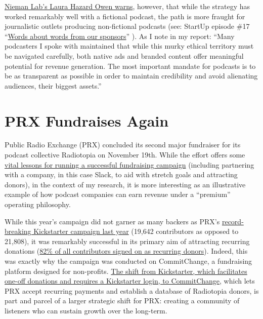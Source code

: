 \documentclass[notoc, symmetric, nobib, nols]{towcenter-guideto-book}
\begin{document}
\href{http://www.niemanlab.org/2015/11/how-did-the-ge-branded-podcast-the-message-hit-no-1-on-itunes-in-part-by-sounding-nothing-like-an-ad/}{Nieman Lab's Laura Hazard Owen warns}, however, that while the strategy has worked remarkably well with a fictional podcast, the path is more fraught for journalistic outlets producing non-fictional podcasts\autocite{niemanMessage} (see: StartUp episode \#17 ``\href{https://gimletmedia.com/episode/17-words-about-words-from-our-sponsors/}{Words about words from our sponsors}'' \autocite{gimletPodcast}). As I note in my report: ``Many podcasters I spoke with maintained that while this murky ethical territory must be navigated carefully, both native ads and branded content offer meaningful potential for revenue generation. The most important mandate for podcasts is to be as transparent as possible in order to maintain credibility and avoid alienating audiences, their biggest assets.'' 

\section{PRX Fundraises Again}
Public Radio Exchange (PRX) concluded its second major fundraiser for its podcast collective Radiotopia on November 19th. While the effort offers some \href{http://blog.prx.org/2015/11/the-coin-the-quilt-and-the-superfan-radiotopia-fundraising-lessons/}{vital lessons for running a successful fundraising campaign} (including partnering with a company, in this case Slack, to aid with stretch goals and attracting donors), in the context of my research, it is more interesting as an illustrative example of how podcast companies can earn revenue under a ``premium'' operating philosophy.\autocite{PRXblog} 

While this year's campaign did not garner as many backers as PRX's \href{http://knightfoundation.org/blogs/knightblog/2014/11/14/radiotopia-sets-record-for-publishing-and-radio-funding-on-kickstarter/}{record-breaking Kickstarter campaign last year} (19,642 contributors as opposed to 21,808)\autocite{radiotopia}, it was remarkably successful in its primary aim of attracting recurring donations (\href{http://blog.prx.org/2015/11/the-coin-the-quilt-and-the-superfan-radiotopia-fundraising-lessons/}{82\% of all contributors signed on as recurring donors}\autocite{PRXblog}). Indeed, this was exactly why the campaign was conducted on CommitChange, a fundraising platform designed for non-profits. \href{http://www.niemanlab.org/2015/10/how-prx-and-radiotopia-are-rethinking-the-public-radio-pledge-drive-for-the-podcast-era/}{The shift from Kickstarter, which facilitates one-off donations and requires a Kickstarter login, to CommitChange}, which lets PRX accept recurring payments and establish a database of Radiotopia donors, is part and parcel of a larger strategic shift for PRX: creating a community of listeners who can sustain growth over the long-term.\autocite{niemanPRX}
\end{document}
